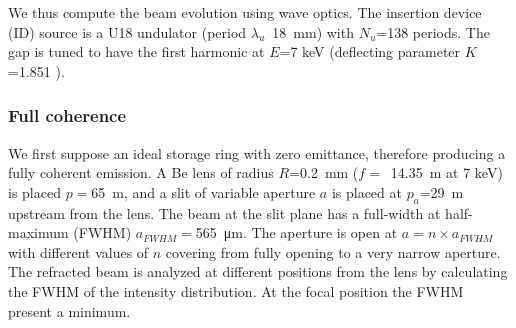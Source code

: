 \documentclass{iucr}              %
\begin{document}



We thus compute the beam evolution using wave optics. The insertion device (ID) source is a U18 undulator (period $\lambda_u$~\SI{18}{\milli\meter}) with $N_u$=138 periods. The gap is tuned to have the first harmonic at $E$=7 keV (deflecting parameter $K$=1.851 ). 

\subsubsection{Full coherence} We first suppose an ideal storage ring with zero emittance, therefore producing a fully coherent emission. A Be lens of radius $R$=\SI{0.2}{\milli\meter} ($f=$~\SI{14.35}{\meter} at 7 keV) is placed $p=$\SI{65}{\meter}, and a slit of variable aperture $a$ is placed at $p_a$=\SI{29}{\meter} upstream from the lens. The beam at the slit plane has a full-width at half-maximum (FWHM) $a_{FWHM}=$\SI{565}{\micro\meter}. The aperture is open at $a = n \times a_{FWHM}$ with different values of $n$ covering from fully opening to a very narrow aperture. The refracted beam is analyzed at different positions from the lens by calculating the FWHM of the intensity distribution. At the focal position the FWHM present a minimum. 
\end{document}
